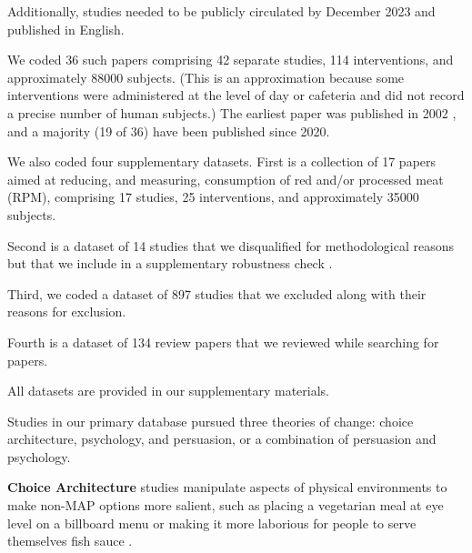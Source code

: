 \documentclass[sn-nature,pdflatex]{sn-jnl}
\begin{document}
Additionally, studies needed to be publicly circulated by December 2023
and published in English.

We coded 36 such papers
\citep{andersson2021, kanchanachitra2020, abrahamse2007, acharya2004, banerjee2019, bianchi2022, bochmann2017, bschaden2020, carfora2023, hennessy2016, piester2020, cooney2014, cooney2016, feltz2022, haile2021, hatami2018, jalil2023, mathur2021effectiveness, merrill2009, norris2014, peacock2017, polanco2022, sparkman2021, weingarten2022, aldoh2023, allen2002, camp2019, coker2022, griesoph2021, sparkman2017, sparkman2020, berndsen2005, bertolaso2015, fehrenbach2015, mattson2020, shreedhar2021}
comprising 42 separate studies, 114 interventions, and approximately
88000 subjects. (This is an approximation because some interventions
were administered at the level of day or cafeteria and did not record a
precise number of human subjects.) The earliest paper was published in
2002 \citep{allen2002}, and a majority (19 of 36) have been published
since 2020.

We also coded four supplementary datasets. First is a collection of 17
papers
\citep{anderson2017, carfora2017correlational, carfora2017randomised, carfora2019, carfora2019informational, delichatsios2001talking, dijkstra2022, emmons2005cancer, emmons2005project, jaacks2014, james2015, lee2018, perino2022, schatzkin2000, sorensen2005, wolstenholme2020}
aimed at reducing, and measuring, consumption of red and/or processed
meat (RPM), comprising 17 studies, 25 interventions, and approximately
35000 subjects.

Second is a dataset of 14 studies that we disqualified for
methodological reasons but that we include in a supplementary robustness
check
\citep{alblas2023, beresford2006, dannenberg2023, delichatsios2001eatsmart, epperson2021, frie2022, garnett2020, hansen2021, kaiser2020, lentz2020, lindstrom2015, loy2016, piazza2022, reinders2017, vlaeminck2014}.

Third, we coded a dataset of 897 studies that we excluded along with
their reasons for exclusion.

Fourth is a dataset of 134 review papers that we reviewed while
searching for papers.

All datasets are provided in our supplementary materials.

Studies in our primary database pursued three theories of change: choice
architecture, psychology, and persuasion, or a combination of persuasion
and psychology.

\textbf{Choice Architecture} studies
\citep{andersson2021, kanchanachitra2020} manipulate aspects of physical
environments to make non-MAP options more salient, such as placing a
vegetarian meal at eye level on a billboard menu \citep{andersson2021}
or making it more laborious for people to serve themselves fish sauce
\citep{kanchanachitra2020}.
\end{document}
